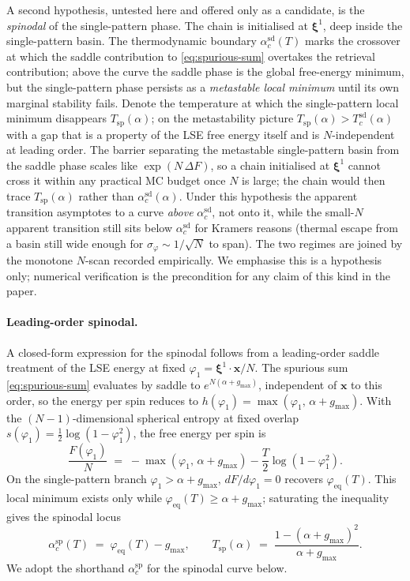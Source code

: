 \documentclass[11pt]{article}
\newcommand{\bxi}{\boldsymbol{\xi}}
\newcommand{\bx}{\bm{x}}
\newcommand{\acSd}{\alpha_c^{\mathrm{sd}}}
\newcommand{\acSp}{\alpha_c^{\mathrm{sp}}}
\begin{document}
A second hypothesis, untested here and offered only as a candidate,
is the \emph{spinodal} of the single-pattern phase. The chain is
initialised at $\bxi^1$, deep inside the single-pattern basin. The
thermodynamic boundary $\acSd(T)$ marks the crossover at which the
saddle contribution to \eqref{eq:spurious-sum} overtakes the
retrieval contribution; above the curve the saddle phase is the
global free-energy minimum, but the single-pattern phase persists
as a \emph{metastable local minimum} until its own marginal
stability fails. Denote the temperature at which the single-pattern
local minimum disappears $T_{\mathrm{sp}}(\alpha)$; on the
metastability picture $T_{\mathrm{sp}}(\alpha) > T_c^{\mathrm{sd}}
(\alpha)$ with a gap that is a property of the LSE free energy
itself and is $N$-independent at leading order. The barrier
separating the metastable single-pattern basin from the saddle
phase scales like $\exp(N\,\Delta F)$, so a chain initialised at
$\bxi^1$ cannot cross it within any practical MC budget once $N$
is large; the chain would then trace $T_{\mathrm{sp}}(\alpha)$
rather than $\acSd(\alpha)$. Under this hypothesis the apparent
transition asymptotes to a curve \emph{above} $\acSd$, not onto
it, while the small-$N$ apparent transition still sits below
$\acSd$ for Kramers reasons (thermal escape from a basin still
wide enough for $\sigma_\varphi \sim 1/\sqrt{N}$ to span). The
two regimes are joined by the monotone $N$-scan recorded
empirically. We emphasise this is a hypothesis only; numerical
verification is the precondition for any claim of this kind in
the paper.

\paragraph{Leading-order spinodal.}
\label{sec:mc:spinodal-formula}
A closed-form expression for the spinodal follows from a
leading-order saddle treatment of the LSE energy at fixed
$\varphi_1 = \bxi^1 \!\cdot\!\bx/N$. The spurious sum
\eqref{eq:spurious-sum} evaluates by saddle to
$e^{N(\alpha + g_{\max})}$, independent of $\bx$ to this order, so
the energy per spin reduces to
$h(\varphi_1) = \max(\varphi_1,\,\alpha + g_{\max})$. With the
$(N-1)$-dimensional spherical entropy at fixed overlap
$s(\varphi_1) = \tfrac12 \log(1 - \varphi_1^2)$, the free energy
per spin is
\begin{equation}
\frac{F(\varphi_1)}{N} \;=\; -\max(\varphi_1,\,\alpha+g_{\max})
                              -\frac{T}{2}\log(1-\varphi_1^2).
\label{eq:F-leading}
\end{equation}
On the single-pattern branch $\varphi_1 > \alpha + g_{\max}$,
$dF/d\varphi_1 = 0$ recovers $\varphi_{\mathrm{eq}}(T)$. This
local minimum exists only while $\varphi_{\mathrm{eq}}(T)
\geq \alpha + g_{\max}$; saturating the inequality gives the
spinodal locus
\begin{equation}
\boxed{\;
\acSp(T) \;=\; \varphi_{\mathrm{eq}}(T) - g_{\max},
\qquad
T_{\mathrm{sp}}(\alpha) \;=\;
\frac{1-(\alpha+g_{\max})^2}{\alpha+g_{\max}}.
\;}
\label{eq:acsp}
\end{equation}
We adopt the shorthand $\acSp$ for the spinodal curve below.
\end{document}
